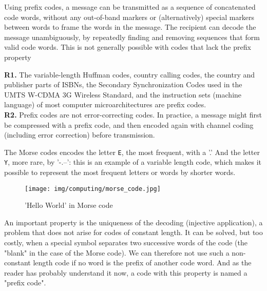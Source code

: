 	Using prefix codes, a message can be transmitted as a sequence of concatenated code words, without any out-of-band markers or (alternatively) special markers between words to frame the words in the message. The recipient can decode the message unambiguously, by repeatedly finding and removing sequences that form valid code words. This is not generally possible with codes that lack the prefix property
	\begin{tcolorbox}[title=Remarks,colframe=black,arc=10pt]
	\textbf{R1.} The variable-length Huffman codes, country calling codes, the country and publisher parts of ISBNs, the Secondary Synchronization Codes used in the UMTS W-CDMA 3G Wireless Standard, and the instruction sets (machine language) of most computer microarchitectures are prefix codes.\\
	
	\textbf{R2.} Prefix codes are not error-correcting codes. In practice, a message might first be compressed with a prefix code, and then encoded again with channel coding (including error correction) before transmission.
	\end{tcolorbox}
	The Morse codes encodes the letter \texttt{E}, the most frequent, with a '.' And the letter \texttt{Y}, more rare, by '-.--': this is an example of a variable length code, which makes it possible to represent the most frequent letters or words by shorter words. 
	\begin{figure}[H]
		\centering
		\texttt{[image: img/computing/morse\_code.jpg]}
		\caption{'Hello World' in Morse code}
	\end{figure}
	An important property is the uniqueness of the decoding (injective application), a problem that does not arise for codes of constant length. It can be solved, but too costly, when a special symbol separates two successive words of the code (the "blank" in the case of the Morse code). We can therefore not use such a non-constant length code if no word is the prefix of another code word. And as the reader has probably understand it now, a code with this property is named a "prefix code".
	

